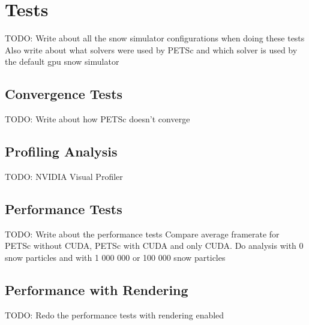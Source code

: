 \section{Tests}

TODO: Write about all the snow simulator configurations when doing these tests
Also write about what solvers were used by PETSc and which solver is used
by the default gpu snow simulator

\subsection{Convergence Tests}

TODO: Write about how PETSc doesn't converge

\subsection{Profiling Analysis}

TODO: NVIDIA Visual Profiler

\subsection{Performance Tests}

TODO: Write about the performance tests
Compare average framerate for PETSc without CUDA, PETSc with CUDA and only CUDA.
Do analysis with 0 snow particles and with 1 000 000 or 100 000 snow particles 

\subsection{Performance with Rendering}

TODO: Redo the performance tests with rendering enabled
